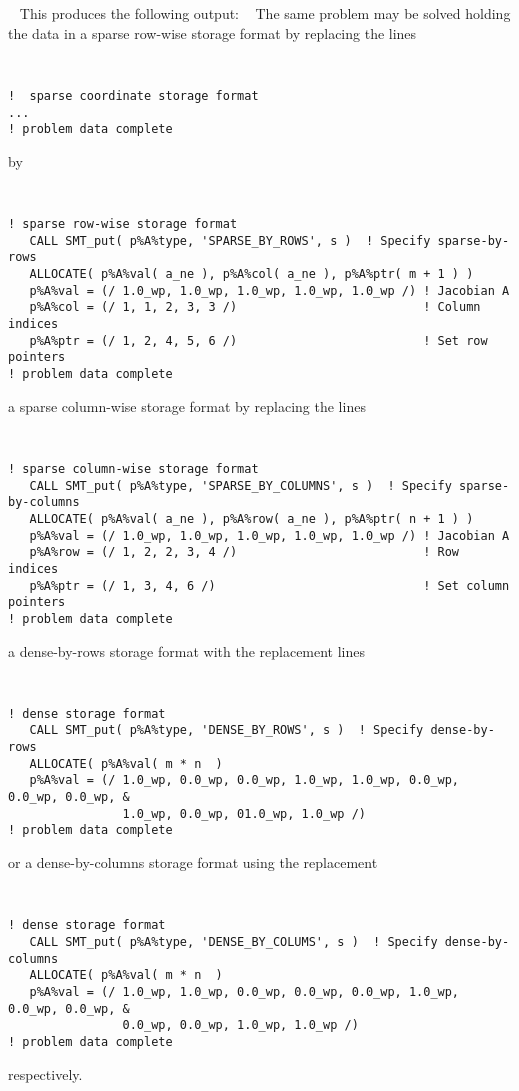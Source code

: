 \documentclass{galahad}
\begin{document}
{\tt \small
\VerbatimInput{\packageexample}
}
\noindent
This produces the following output: \vspace*{-2mm}
{\tt \small
\VerbatimInput{\packageresults}
}
\noindent
The same problem may be solved holding the data in
a sparse row-wise storage format by replacing the lines
{\tt \small
\begin{verbatim}
!  sparse coordinate storage format
...
! problem data complete
\end{verbatim}
}
\noindent
by
{\tt \small
\begin{verbatim}
! sparse row-wise storage format
   CALL SMT_put( p%A%type, 'SPARSE_BY_ROWS', s )  ! Specify sparse-by-rows
   ALLOCATE( p%A%val( a_ne ), p%A%col( a_ne ), p%A%ptr( m + 1 ) )
   p%A%val = (/ 1.0_wp, 1.0_wp, 1.0_wp, 1.0_wp, 1.0_wp /) ! Jacobian A
   p%A%col = (/ 1, 1, 2, 3, 3 /)                          ! Column indices
   p%A%ptr = (/ 1, 2, 4, 5, 6 /)                          ! Set row pointers
! problem data complete
\end{verbatim}
}
\noindent
a sparse column-wise storage format by replacing the lines
{\tt \small
\begin{verbatim}
! sparse column-wise storage format
   CALL SMT_put( p%A%type, 'SPARSE_BY_COLUMNS', s )  ! Specify sparse-by-columns
   ALLOCATE( p%A%val( a_ne ), p%A%row( a_ne ), p%A%ptr( n + 1 ) )
   p%A%val = (/ 1.0_wp, 1.0_wp, 1.0_wp, 1.0_wp, 1.0_wp /) ! Jacobian A
   p%A%row = (/ 1, 2, 2, 3, 4 /)                          ! Row indices
   p%A%ptr = (/ 1, 3, 4, 6 /)                             ! Set column pointers
! problem data complete
\end{verbatim}
}
\noindent
a dense-by-rows storage format with the replacement lines
{\tt \small
\begin{verbatim}
! dense storage format
   CALL SMT_put( p%A%type, 'DENSE_BY_ROWS', s )  ! Specify dense-by-rows
   ALLOCATE( p%A%val( m * n  )
   p%A%val = (/ 1.0_wp, 0.0_wp, 0.0_wp, 1.0_wp, 1.0_wp, 0.0_wp, 0.0_wp, 0.0_wp, &
                1.0_wp, 0.0_wp, 01.0_wp, 1.0_wp /)
! problem data complete
\end{verbatim}
}
\noindent
or a dense-by-columns storage format using the replacement
{\tt \small
\begin{verbatim}
! dense storage format
   CALL SMT_put( p%A%type, 'DENSE_BY_COLUMS', s )  ! Specify dense-by-columns
   ALLOCATE( p%A%val( m * n  )
   p%A%val = (/ 1.0_wp, 1.0_wp, 0.0_wp, 0.0_wp, 0.0_wp, 1.0_wp, 0.0_wp, 0.0_wp, &
                0.0_wp, 0.0_wp, 1.0_wp, 1.0_wp /)
! problem data complete
\end{verbatim}
}
\noindent
respectively.
\end{document}
